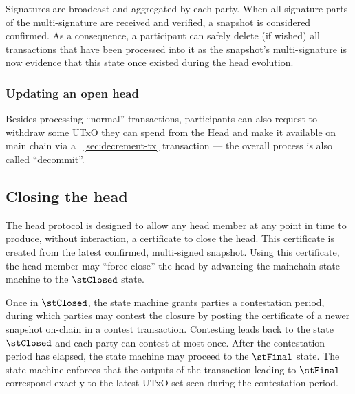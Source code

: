 Signatures are broadcast and aggregated by each party. When all signature parts
of the multi-signature are received and verified, a snapshot is considered
confirmed. As a consequence, a participant can safely delete (if wished) all
transactions that have been processed into it as the snapshot's multi-signature
is now evidence that this state once existed during the head evolution.

\subsubsection{Updating an open head}

Besides processing ``normal'' transactions, participants can also request to
withdraw some UTxO they can spend from the Head and make it available on main
chain via a \mtxDecrement{}~\ref{sec:decrement-tx} transaction --- the overall process is also called
``decommit''.


\subsection{Closing the head}

The head protocol is designed to allow any head member at any point in time to
produce, without interaction, a certificate to close the head. This certificate
is created from the latest confirmed, multi-signed snapshot. Using this
certificate, the head member may ``force close'' the head by advancing the
mainchain state machine to the $\stClosed$ state.

Once in $\stClosed$, the state machine grants parties a contestation period,
during which parties may contest the closure by posting the certificate of a
newer snapshot on-chain in a contest transaction. Contesting leads back to the
state $\stClosed$ and each party can contest at most once. After the
contestation period has elapsed, the state machine may proceed to the $\stFinal$
state. The state machine enforces that the outputs of the transaction leading to
$\stFinal$ correspond exactly to the latest UTxO set seen during the
contestation period.

